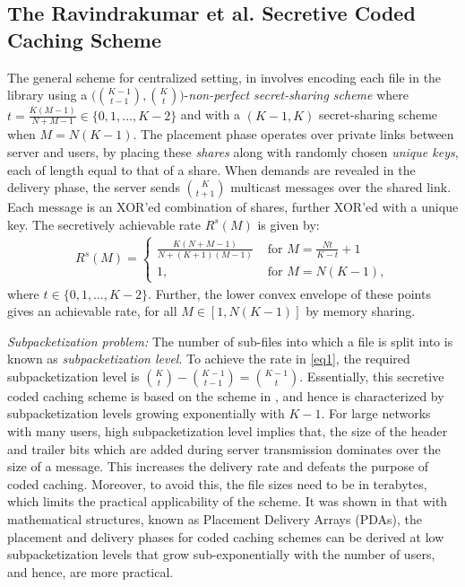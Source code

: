 \documentclass[conference]{IEEEtran}
\begin{document}
\subsection{The Ravindrakumar et al. Secretive Coded Caching Scheme}
\label{sec1A}
The general scheme for centralized setting, in \cite{PrivateCc} involves encoding each file in the library using a $\big(\binom{K-1}{t-1},\binom{K}{t}\big)$-\emph{non-perfect secret-sharing scheme} where $t=\frac{K(M-1)}{N+M-1}\in\{0,1,\ldots,K-2\}$ and with a $(K-1,K)$ secret-sharing scheme when $M=N(K-1)$. The placement phase operates over private links between server and users, by placing these \emph{shares} along with randomly chosen \emph{unique keys}, each of length equal to that of a share. When demands are revealed in the delivery phase, the server sends $\binom{K}{t+1}$ multicast messages over the shared link. Each message is an XOR'ed  combination of shares, further XOR'ed with a unique key. The secretively achievable rate $R^s(M)$ is given by:
\begin{align}
\label{eq1}
R^s(M)=
\begin{cases}
\frac{K(N+M-1)}{N+(K+1)(M-1)} & \text{ for }  M=\frac{Nt}{K-t}+1\\
1, & \text{ for }  M=N(K-1),
\end{cases}
\end{align}
where $t\in\{0,1,\ldots,K-2\}$. Further, the lower convex envelope of these points gives an achievable rate, for all $M\in[1,N(K-1)]$ by memory sharing.
\par \emph{Subpacketization problem:}
	The number of sub-files into which a file is split into is known as \emph{subpacketization level}. To achieve the rate in \eqref{eq1}, the required subpacketization level is $\binom{K}{t}-\binom{K-1}{t-1}=\binom{K-1}{t}$.
	  Essentially, this secretive coded caching scheme is based on the  scheme in \cite{MaNcentCc}, and hence is characterized by subpacketization levels growing exponentially with $K-1$. For large networks with many users, high subpacketization level implies that, the size of the header and trailer bits which are added during server transmission dominates over the size of a message. This increases the delivery rate and defeats the purpose of coded caching. Moreover, to avoid this, the file sizes need to be in terabytes, which limits the practical applicability of the scheme. It was shown in \cite{PDAmain} that with mathematical structures, known as Placement Delivery Arrays (PDAs), the placement and delivery phases for coded caching schemes can be derived at low subpacketization levels that grow sub-exponentially with the number of users, and hence, are more practical. 
\end{document}
